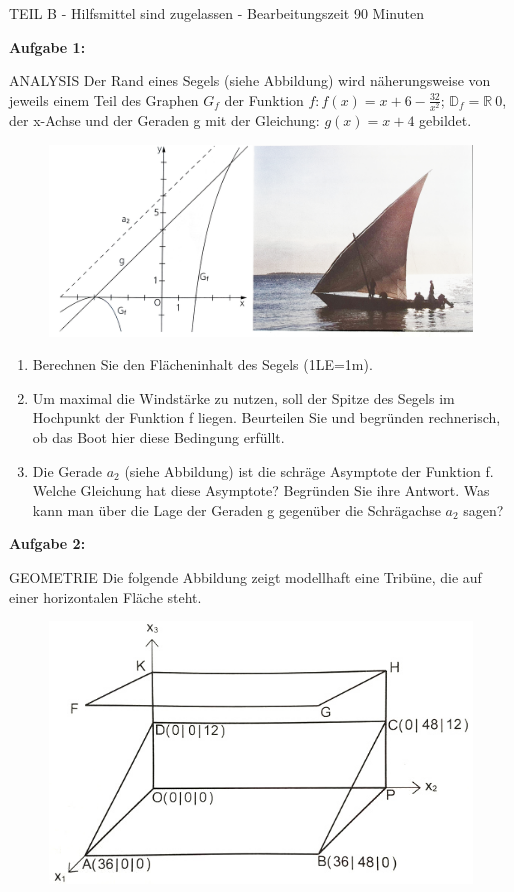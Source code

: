 \documentclass[a4paper,12pt]{article}
\newcommand{\Aufgabe}[1]{
  {
  \vspace*{0.5cm}
  \textsf{\textbf{Aufgabe #1}}
  \vspace*{0.2cm}
  
  }
}
\begin{document}
\newpage



\vspace{0,5cm} {TEIL B} -  Hilfsmittel sind zugelassen - Bearbeitungszeit 90 Minuten

\Aufgabe {1:} ANALYSIS
Der Rand eines Segels (siehe Abbildung) wird näherungsweise von jeweils einem Teil des Graphen $G_f$ der Funktion $f: f(x)=x+6-\frac{32}{x^2}$;
$ \mathbb{D}_f= \mathbb{R}\  {0}$, der x-Achse und der Geraden g mit der Gleichung: $g(x)=x+4$ gebildet.

\begin{figure}[h!]
  \begin{center}
    \includegraphics[width=0.8\linewidth]{bols201202.jpeg}
  \end{center}
\end{figure}

\begin{enumerate}[label={\alph*)}]
\item Berechnen Sie den Flächeninhalt des Segels (1LE=1m).
\item Um maximal die Windstärke zu nutzen, soll der Spitze des Segels im Hochpunkt der Funktion f liegen. Beurteilen Sie und begründen rechnerisch, ob das Boot hier diese Bedingung erfüllt. 
\item Die Gerade $a_2$ (siehe Abbildung) ist die schräge Asymptote der Funktion f. Welche Gleichung hat diese Asymptote? Begründen Sie ihre Antwort. Was kann man über die Lage der Geraden g gegenüber die Schrägachse $a_2$ sagen? 
\end{enumerate}  



\Aufgabe{2:} GEOMETRIE
Die folgende Abbildung zeigt modellhaft eine Tribüne, die auf einer horizontalen Fläche steht.

\begin{figure}[h!]
  \begin{center}
    \includegraphics[width=0.7\linewidth]{tribüne.jpg}
  \end{center}
\end{figure}
\end{document}

